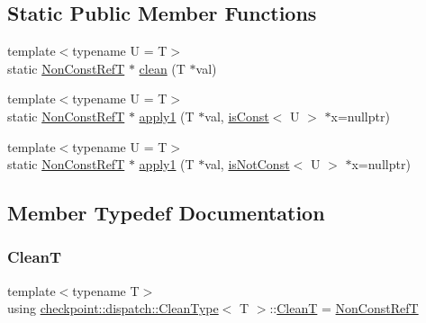 \subsection*{Static Public Member Functions}
\begin{DoxyCompactItemize}
\item 
{\footnotesize template$<$typename U  = T$>$ }\\static \hyperlink{structcheckpoint_1_1dispatch_1_1_clean_type_a22ac8ae19000187cd7d3d218f3efa46e}{Non\+Const\+RefT} $\ast$ \hyperlink{structcheckpoint_1_1dispatch_1_1_clean_type_a3cae7a0e99d5ad8455d449b564a6e420}{clean} (T $\ast$val)
\item 
{\footnotesize template$<$typename U  = T$>$ }\\static \hyperlink{structcheckpoint_1_1dispatch_1_1_clean_type_a22ac8ae19000187cd7d3d218f3efa46e}{Non\+Const\+RefT} $\ast$ \hyperlink{structcheckpoint_1_1dispatch_1_1_clean_type_a7838d4676520ae8b8947a70691e63226}{apply1} (T $\ast$val, \hyperlink{structcheckpoint_1_1dispatch_1_1_clean_type_a8edf98e1e2cbcd55b0b0a57d563be9e7}{is\+Const}$<$ U $>$ $\ast$x=nullptr)
\item 
{\footnotesize template$<$typename U  = T$>$ }\\static \hyperlink{structcheckpoint_1_1dispatch_1_1_clean_type_a22ac8ae19000187cd7d3d218f3efa46e}{Non\+Const\+RefT} $\ast$ \hyperlink{structcheckpoint_1_1dispatch_1_1_clean_type_ac766696a734e2b65f223e91f11087962}{apply1} (T $\ast$val, \hyperlink{structcheckpoint_1_1dispatch_1_1_clean_type_a87436675be4aca146c0ff68911684634}{is\+Not\+Const}$<$ U $>$ $\ast$x=nullptr)
\end{DoxyCompactItemize}


\subsection{Member Typedef Documentation}
\mbox{\label{structcheckpoint_1_1dispatch_1_1_clean_type_a5ca6cd4c73773e29c340901d3e6864d2}} 
\subsubsection{\texorpdfstring{CleanT}{CleanT}}
{\footnotesize\ttfamily template$<$typename T$>$ \\
using \hyperlink{structcheckpoint_1_1dispatch_1_1_clean_type}{checkpoint\+::dispatch\+::\+Clean\+Type}$<$ T $>$\+::\hyperlink{structcheckpoint_1_1dispatch_1_1_clean_type_a5ca6cd4c73773e29c340901d3e6864d2}{CleanT} =  \hyperlink{structcheckpoint_1_1dispatch_1_1_clean_type_a22ac8ae19000187cd7d3d218f3efa46e}{Non\+Const\+RefT}}

